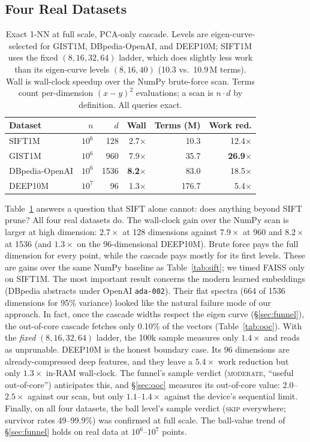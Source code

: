 \documentclass[sigconf, nonacm]{acmart}
\begin{document}
\subsection{Four Real Datasets}
\label{sec:datasets}

\begin{table}[t]
\caption{Exact 1-NN at full scale, PCA-only cascade. Levels are
eigen-curve-selected for GIST1M, DBpedia-OpenAI, and DEEP10M; SIFT1M uses
the fixed $(8,16,32,64)$ ladder, which does slightly less work than its
eigen-curve levels $(8,16,40)$ (10.3 vs.\ 10.9\,M terms). Wall is
wall-clock speedup over the NumPy brute-force scan. Terms count
per-dimension $(x{-}y)^2$ evaluations; a scan is $n \cdot d$ by
definition. All queries exact.}
\label{tab:datasets}
\small
\begin{tabular}{@{}lrrrrr@{}}
\toprule
Dataset & $n$ & $d$ & Wall & Terms (M) & Work red. \\
\midrule
SIFT1M & $10^6$ & 128 & 2.7$\times$ & 10.3 & 12.4$\times$ \\
GIST1M & $10^6$ & 960 & 7.9$\times$ & 35.7 & \textbf{26.9$\times$} \\
DBpedia-OpenAI & $10^6$ & 1536 & \textbf{8.2$\times$} & 83.0 & 18.5$\times$ \\
DEEP10M & $10^7$ & 96 & 1.3$\times$ & 176.7 & 5.4$\times$ \\
\bottomrule
\end{tabular}
\end{table}

Table~\ref{tab:datasets} answers a question that SIFT alone cannot: does
anything beyond SIFT prune? All four real datasets do. The wall-clock gain
over the NumPy scan is larger at high dimension: $2.7\times$ at 128
dimensions against $7.9\times$ at 960 and $8.2\times$ at 1536 (and
$1.3\times$ on the 96-dimensional DEEP10M). Brute force pays the full
dimension for every point, while the cascade pays mostly for its first
levels. These are gains over the same NumPy baseline as
Table~\ref{tab:sift}; we timed FAISS only on SIFT1M. The most important
result concerns the modern learned embeddings (DBpedia abstracts under
OpenAI \texttt{ada-002}). Their flat spectra (664 of 1536 dimensions for
95\% variance) looked like the natural failure mode of our approach. In
fact, once the cascade widths respect the eigen curve
(\S\ref{sec:funnel}), the out-of-core cascade fetches only 0.10\% of the
vectors (Table~\ref{tab:ooc}). With the \emph{fixed} $(8,16,32,64)$
ladder, the 100k sample measures only $1.4\times$ and reads as
unprunable. DEEP10M is the honest boundary case. Its 96 dimensions are
already-compressed deep features, and they leave a $5.4\times$ work
reduction but only $1.3\times$ in-RAM wall-clock. The funnel's sample
verdict (\textsc{moderate}, ``useful out-of-core'') anticipates this, and
\S\ref{sec:ooc} measures its out-of-core value: $2.0$--$2.5\times$
against our scan, but only $1.1$--$1.4\times$ against the device's
sequential limit. Finally, on all four datasets, the ball level's sample
verdict (\textsc{skip} everywhere; survivor rates 49--99.9\%) was
confirmed at full scale. The
ball-value trend of \S\ref{sec:funnel} holds on real data at
$10^6$--$10^7$ points.
\end{document}
